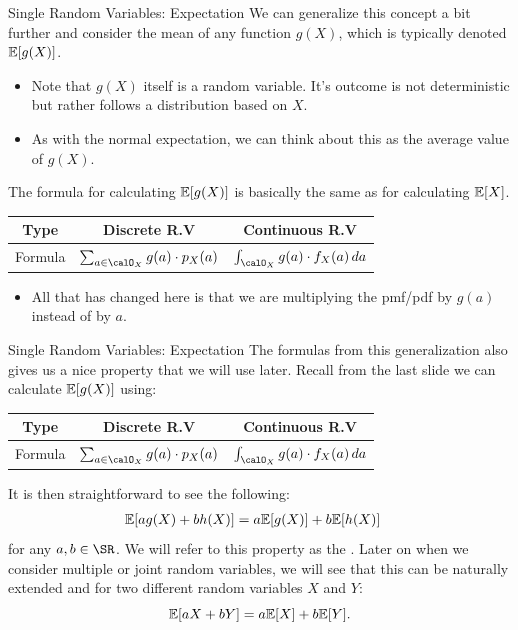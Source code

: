 \documentclass[notheorems,9pt]{beamer}
\begin{document}
\begin{frame}{Single Random Variables: Expectation} 
	\label{frame:srv-mean2}
	\onslide<+->
	We can generalize this concept a bit further and consider the mean of any function \(g(X)\), which is typically denoted \(\mathbb{E}[g(X)]\).
	\begin{itemize}
		\item Note that \(g(X)\) itself is a random variable. It's outcome is not deterministic but rather follows a distribution based on \(X\).
		\item As with the normal expectation, we can think about this as the average value of \(g(X)\). 
	\end{itemize}
	\onslide<+->
	The formula for calculating \(\mathbb{E}[g(X)]\) is basically the same as for calculating \(\mathbb{E}[X]\).
	{\large 
		\begin{table}[htpb]
		\renewcommand{\arraystretch}{1.5}
		\centering
		\begin{tabular}{c|cc}
			Type  & Discrete R.V & Continuous R.V \\
			\hline
			Formula & \(\sum_{a\in\calO_X} g(a)\cdot p_X(a)\) & \( \int_{\calO_X} g(a)\cdot  f_X(a)\,da\)
		\end{tabular}
		\end{table}}
	\onslide<+->
	\vspace{2mm}
	\begin{itemize}
		\item All that has changed here is that we are multiplying the pmf/pdf by \(g(a)\) instead of by \(a\).
	\end{itemize}
\end{frame}
\begin{frame}{Single Random Variables: Expectation} 
	\label{frame:srv-mean-properties}
	The formulas from this generalization also gives us a nice property that we will use later. Recall from the last slide we can calculate \(\mathbb{E}[g(X)]\) using:
	{\large 
		\begin{table}[htpb]
		\renewcommand{\arraystretch}{1.5}
		\centering
		\begin{tabular}{c|cc}
			Type  & Discrete R.V & Continuous R.V \\
			\hline
			Formula & \(\sum_{a\in\calO_X} g(a)\cdot p_X(a)\) & \( \int_{\calO_X} g(a)\cdot  f_X(a)\,da\)
		\end{tabular}
		\end{table}}
	\vspace{5mm}

	It is then straightforward to see the following: 
	\begin{align*}
		\mathbb{E}[ag(X)+bh(X)] &= a\mathbb{E}[g(X)] + b\mathbb{E}[h(X)]
	\end{align*}
	for any \(a,b\in\SR\). We will refer to this property as the . Later on when we consider multiple or joint random variables, we will see that this can be naturally extended and for two different random variables \(X\) and \(Y\):
	\[
	    \mathbb{E}[aX+bY] = a\mathbb{E}[X] + b\mathbb{E}[Y]
	.\] 
\end{frame}
\end{document}
